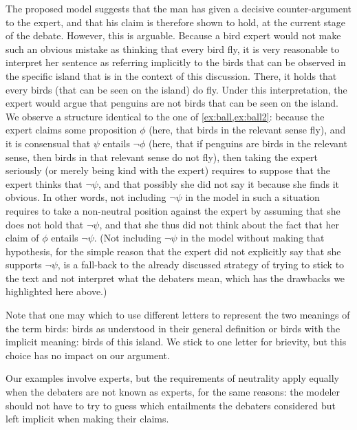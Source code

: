 \documentclass[version=3.21, pagesize, twoside=off, bibliography=totoc, DIV=calc, fontsize=12pt, a4paper, french, english]{scrartcl}
\begin{document}
The proposed model suggests that the man has given a decisive counter-argument to the expert, and that his claim is therefore shown to hold, at the current stage of the debate. However, this is arguable. Because a bird expert would not make such an obvious mistake as thinking that every bird fly, it is very reasonable to interpret her sentence as referring implicitly to the birds that can be observed in the specific island that is in the context of this discussion. There, it holds that every birds (that can be seen on the island) do fly. Under this interpretation, the expert would argue that penguins are not birds that can be seen on the island. We observe a structure identical to the one of \cref{ex:ball,ex:ball2}: because the expert claims some proposition $\phi$ (here, that birds in the relevant sense fly), and it is consensual that $\psi$ entails $¬\phi$ (here, that if penguins are birds in the relevant sense, then birds in that relevant sense do not fly), then taking the expert seriously (or merely being kind with the expert) requires to suppose that the expert thinks that $¬\psi$, and that possibly she did not say it because she finds it obvious. In other words, not including $¬\psi$ in the model in such a situation requires to take a non-neutral position against the expert by assuming that she does not hold that $¬\psi$, and that she thus did not think about the fact that her claim of $\phi$ entails $¬\psi$. (Not including $¬\psi$ in the model without making that hypothesis, for the simple reason that the expert did not explicitly say that she supports $¬\psi$, is a fall-back to the already discussed strategy of trying to stick to the text and not interpret what the debaters mean, which has the drawbacks we highlighted here above.)

Note that one may which to use different letters to represent the two meanings of the term birds: birds as understood in their general definition or birds with the implicit meaning: birds of this island. We stick to one letter for brievity, but this choice has no impact on our argument.

Our examples involve experts, but the requirements of neutrality apply equally when the debaters are not known as experts, for the same reasons: the modeler should not have to try to guess which entailments the debaters considered but left implicit when making their claims.
\end{document}
